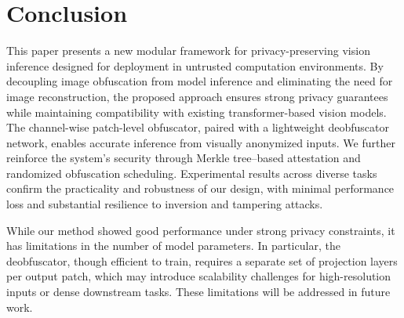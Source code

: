\documentclass{ieeeaccess}
\begin{document}
\section{Conclusion} \label{sec:con}

This paper presents a new modular framework for privacy-preserving vision inference designed for deployment in untrusted computation environments. By decoupling image obfuscation from model inference and eliminating the need for image reconstruction, the proposed approach ensures strong privacy guarantees while maintaining compatibility with existing transformer-based vision models. The channel-wise patch-level obfuscator, paired with a lightweight deobfuscator network, enables accurate inference from visually anonymized inputs. We further reinforce the system’s security through Merkle tree–based attestation and randomized obfuscation scheduling. Experimental results across diverse tasks confirm the practicality and robustness of our design, with minimal performance loss and substantial resilience to inversion and tampering attacks.

While our method showed good performance under strong privacy constraints, it has limitations in the number of model parameters. In particular, the deobfuscator, though efficient to train, requires a separate set of projection layers per output patch, which may introduce scalability challenges for high-resolution inputs or dense downstream tasks. These limitations will be addressed in future work.









\end{document}
